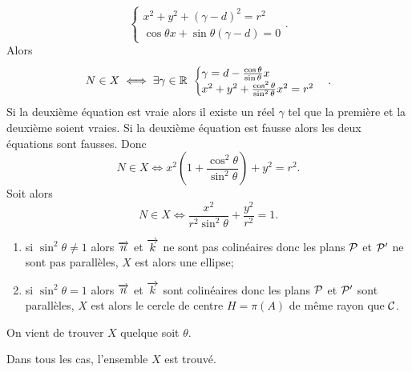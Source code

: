 \begin{enumerate}
\begin{equation}
\begin{cases}
        x^2 + y^2 + (\gamma - d)^2 = r^2\\
        \cos\theta x + \sin\theta (\gamma - d) = 0
      \end{cases}.
    \end{equation}
    Alors
    \begin{equation}
      N \in X \iff \exists \gamma \in \R \ 
      \begin{cases} 
        \gamma = d - \frac{\cos\theta}{\sin\theta}x \\ 
        x^2 + y^2 + \frac{\cos^2\theta}{\sin^2\theta}x^2 = r^2
      \end{cases}.
    \end{equation}
    Si la deuxième équation est vraie alors il existe un réel \(\gamma\) tel 
    que la première et la deuxième soient vraies. Si la deuxième équation 
    est fausse alors les deux équations sont fausses. Donc
    \begin{equation}
      N \in X \iff x^2\left(1 + \frac{\cos^2\theta}{\sin^2\theta}\right) + 
      y^2 = r^2.
    \end{equation}
    Soit alors 
    \begin{equation}
      N \in X \iff \frac{x^2}{r^2\sin^2\theta} + \frac{y^2}{r^2} = 1.
    \end{equation}
    \begin{enumerate}
      \item si \(\sin^2\theta\neq 1\) alors \(\vn\) et \(\vk\) ne sont pas 
        colinéaires donc les plans \(\P\) et \(\P'\) ne sont pas parallèles, 
        \(X\) est alors une ellipse;
      \item si \(\sin^2\theta = 1\) alors \(\vn\) et \(\vk\) sont 
        colinéaires donc les plans \(\P\) et \(\P'\) sont parallèles, \(X\) 
        est alors le cercle de centre \(H = \pi(A)\) de même rayon que 
        \(\courbe\).
    \end{enumerate}
    On vient de trouver \(X\) quelque soit \(\theta\).
\end{enumerate}
Dans tous les cas, l'ensemble \(X\) est trouvé.

\clearpage

